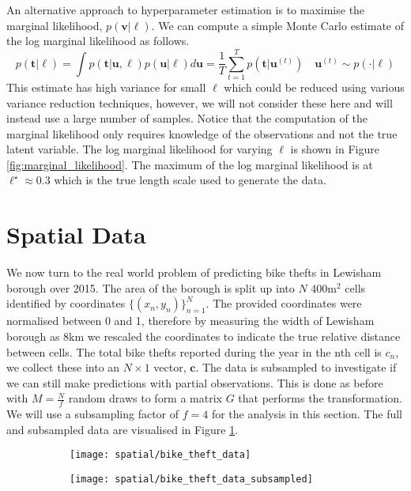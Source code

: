 \documentclass[11pt]{article}
\begin{document}
An alternative approach to hyperparameter estimation is to maximise the marginal likelihood, $p(\boldsymbol{v} | \ell)$. We can compute a simple Monte Carlo estimate of the log marginal likelihood as follows.
\begin{equation}
    p(\boldsymbol{t}| \ell) = \int p(\boldsymbol{t} | \boldsymbol{u}, \ell) p(\boldsymbol{u} | \ell) d\boldsymbol{u} = \frac{1}{T} \sum_{t=1}^{T} p(\boldsymbol{t} | \boldsymbol{u}^{(t)}) \quad \boldsymbol{u}^{(t)} \sim p(\cdot | \ell)
\end{equation}
This estimate has high variance for small $\ell$ which could be reduced using various variance reduction techniques, however, we will not consider these here and will instead use a large number of samples. Notice that the computation of the marginal likelihood only requires knowledge of the observations and not the true latent variable. The log marginal likelihood for varying $\ell$ is shown in Figure \ref{fig:marginal_likelihood}. The maximum of the log marginal likelihood is at $\ell^{\star} \approx 0.3$ which is the true length scale used to generate the data.

\section{Spatial Data}
\setcounter{subsection}{4}
We now turn to the real world problem of predicting bike thefts in Lewisham borough over 2015. The area of the borough is split up into $N$ 400$\text{m}^2$ cells identified by coordinates $\{(x_n, y_n)\}_{n=1}^{N}$. The provided coordinates were normalised between 0 and 1, therefore by measuring the width of Lewisham borough as 8km we rescaled the coordinates to indicate the true relative distance between cells. The total bike thefts reported during the year in the nth cell is $c_n$, we collect these into an $N\times1$ vector, $\boldsymbol{c}$. The data is subsampled to investigate if we can still make predictions with partial observations. This is done as before with $M = \frac{N}{f}$ random draws to form a matrix $G$ that performs the transformation. We will use a subsampling factor of $f=4$ for the analysis in this section. The full and subsampled data are visualised in Figure \ref{fig:bike_theft_data}.

\begin{figure}
    \centering
    \begin{subfigure}{0.45\textwidth}
        \texttt{[image: spatial/bike\_theft\_data]}
    \end{subfigure}
    \begin{subfigure}{0.45\textwidth}
        \texttt{[image: spatial/bike\_theft\_data\_subsampled]}
    \end{subfigure}
    \caption{}
    \label{fig:bike_theft_data}
\end{figure}
\end{document}
